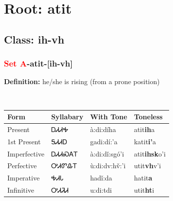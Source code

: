 \needspace{4in}
\section*{Root: atit}
\nopagebreak
{}
\needspace{3in}
\subsection*{Class: ih-vh}
\nopagebreak
\needspace{2in}
\subsubsection*{\textcolor{Red}{Set A}{-}\textbf{atit}{-}[ih-vh]}
\nopagebreak
\textbf{Definition: } he/she is rising (from a prone position)
\\[0.5em]
\begin{tabularx}{\textwidth}{l X X X}%
\toprule%
\textbf{Form}&\textbf{Syllabary}&\textbf{With Tone}&\textbf{Toneless}\\%
\midrule%
Present&ᎠᏗᏗᎭ&à:di:díha&atit\textbf{ih}a\\%
1st Present&ᎦᏗᏗᎠ&gadi:dí:’a&katit\textbf{i'}a\\%
Imperfective&ᎠᏗᏗᏍᎪᎢ&à:di:dǐ:sgó’i&atit\textbf{ihsk}o'i\\%
Perfective&ᎤᏗᏛᎲᎢ&ù:di:dv:hv̌:’i&utit\textbf{vh}v'i\\%
Imperative&ᎭᏗᏓ&hadǐ:da&hatit\textbf{a}\\%
Infinitive&ᎤᏗᏘᏗ&u:di:tdi&utit\textbf{ht}i\\%
\bottomrule%
\end{tabularx}
\\[1em]